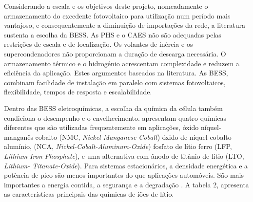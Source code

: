Considerando a escala e os objetivos deste projeto, nomeadamente o armazenamento do excedente fotovoltaico para utilização num período mais vantajoso, e consequentemente a diminuição de importações da rede, a literatura sustenta a escolha da BESS. As PHS e o CAES não são adequadas pelas restrições de escala e de localização. Os volantes de inércia e os supercondenadores não proporcionam a duração de descarga necessária. O armazenamento térmico e o hidrogénio acrescentam complexidade e reduzem a eficiência da aplicação. Estes argumentos baseados na literatura. As BESS, combinam facilidade de instalação em paralelo com sistemas fotovoltaicos, flexibilidade, tempos de resposta e escalabilidade. 


Dentro das BESS eletroquímicas, a escolha da química da célula também condiciona o desempenho e o envelhecimento. \textcite{ Hesse2017} apresentam quatro químicas diferentes que são utilizadas frequentemente em aplicações, óxido níquel-manganês-cobalto (NMC, \textit{Nickel-Manganese-Cobalt}) óxido de níquel cobalto alumínio, (NCA, \textit{Nickel-Cobalt-Aluminum-Oxide}) fosfato de lítio ferro (LFP, \textit{Lithium-Iron-Phosphate}), e uma alternativa com ânodo de titânio de lítio (LTO, \textit{Lithium- Titanate-Oxide}). Para sistemas estacionários, a densidade energética e a potência de pico são menos importantes do que aplicações automóveis. São mais importantes a energia contida, a segurança e a degradação \cite{ Hesse2017}. A tabela 2, apresenta as características principais das químicas de iões de lítio. 



